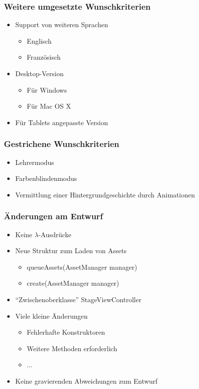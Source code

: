 \documentclass[18pt]{beamer}
\begin{document}
\begin{frame}
	\frametitle{Weitere umgesetzte Wunschkriterien}
	\begin{itemize}[<+->]
		\item Support von weiteren Sprachen
		\begin{itemize}
			\item Englisch
			\item Französisch
		\end{itemize}
		\item Desktop-Version
		\begin{itemize}
			\item Für Windows
			\item Für Mac OS X
		\end{itemize}
		\item Für Tablets angepasste Version
	\end{itemize}
\end{frame}

\begin{frame}
	\frametitle{Gestrichene Wunschkriterien}
	\begin{itemize}[<+->]
		\item Lehrermodus
		\item Farbenblindenmodus
		\item Vermittlung einer Hintergrundgeschichte durch Animationen
	\end{itemize}
\end{frame}

\begin{frame}
	\frametitle{Änderungen am Entwurf}
	\begin{itemize}[<+->]
		\item Keine $\lambda$-Ausdrücke
		\item Neue Struktur zum Laden von Assets
		\begin{itemize}
			\item queueAssets(AssetManager manager)
			\item create(AssetManager manager)
		\end{itemize}
		\item ``Zwischenoberklasse'' StageViewController 
		\item Viele kleine Änderungen
		\begin{itemize}
			\item Fehlerhafte Konstruktoren
			\item Weitere Methoden erforderlich
			\item ...
		\end{itemize}
		\item Keine gravierenden Abweichungen zum Entwurf
	\end{itemize}
\end{frame}
\end{document}
